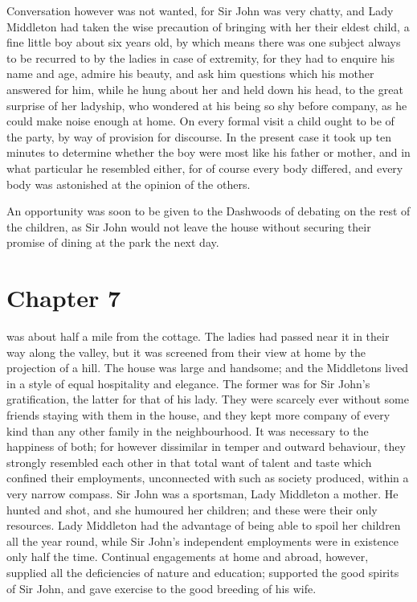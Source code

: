 Conversation however was not wanted, for Sir John
was very chatty, and Lady Middleton had taken the wise
precaution of bringing with her their eldest child, a fine
little boy about six years old, by which means there was
one subject always to be recurred to by the ladies in case
of extremity, for they had to enquire his name and age,
admire his beauty, and ask him questions which his mother
answered for him, while he hung about her and held
down his head, to the great surprise of her ladyship,
who wondered at his being so shy before company, as he
could make noise enough at home.  On every formal visit
a child ought to be of the party, by way of provision
for discourse.  In the present case it took up ten minutes
to determine whether the boy were most like his father
or mother, and in what particular he resembled either,
for of course every body differed, and every body was
astonished at the opinion of the others.

An opportunity was soon to be given to the Dashwoods
of debating on the rest of the children, as Sir John
would not leave the house without securing their promise
of dining at the park the next day.



\chapter{Chapter 7}


 was about half a mile from the cottage.
The ladies had passed near it in their way along the valley,
but it was screened from their view at home by the
projection of a hill.  The house was large and handsome;
and the Middletons lived in a style of equal hospitality
and elegance.  The former was for Sir John's gratification,
the latter for that of his lady.  They were scarcely
ever without some friends staying with them in the house,
and they kept more company of every kind than any other
family in the neighbourhood.  It was necessary to the
happiness of both; for however dissimilar in temper
and outward behaviour, they strongly resembled each other
in that total want of talent and taste which confined
their employments, unconnected with such as society produced,
within a very narrow compass.  Sir John was a sportsman,
Lady Middleton a mother.  He hunted and shot, and she
humoured her children; and these were their only resources.
Lady Middleton had the advantage of being able to spoil her
children all the year round, while Sir John's independent
employments were in existence only half the time.
Continual engagements at home and abroad, however,
supplied all the deficiencies of nature and education;
supported the good spirits of Sir John, and gave exercise
to the good breeding of his wife.

